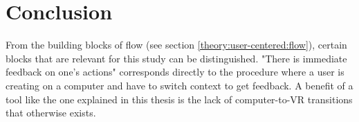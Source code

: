 \chapter{Conclusion}
From the building blocks of flow (see section \ref{theory:user-centered:flow}), certain blocks that are relevant for this study can be distinguished. "There is immediate feedback on one's actions" corresponds directly to the procedure where a user is creating on a computer and have to switch context to get feedback. A benefit of a tool like the one explained in this thesis is the lack of computer-to-VR transitions that otherwise exists.
